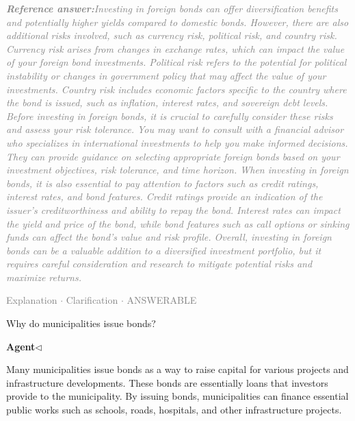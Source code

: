 \documentclass[a4paper,11pt]{article}
\begin{document}
\begin{refanswerenv}
{\footnotesize\textit{\textcolor{gray}{\textbf{Reference answer:}\enspace Investing in foreign bonds can offer diversification benefits and potentially higher yields compared to domestic bonds. However, there are also additional risks involved, such as currency risk, political risk, and country risk. Currency risk arises from changes in exchange rates, which can impact the value of your foreign bond investments. Political risk refers to the potential for political instability or changes in government policy that may affect the value of your investments. Country risk includes economic factors specific to the country where the bond is issued, such as inflation, interest rates, and sovereign debt levels.
Before investing in foreign bonds, it is crucial to carefully consider these risks and assess your risk tolerance. You may want to consult with a financial advisor who specializes in international investments to help you make informed decisions. They can provide guidance on selecting appropriate foreign bonds based on your investment objectives, risk tolerance, and time horizon.
When investing in foreign bonds, it is also essential to pay attention to factors such as credit ratings, interest rates, and bond features. Credit ratings provide an indication of the issuer's creditworthiness and ability to repay the bond. Interest rates can impact the yield and price of the bond, while bond features such as call options or sinking funds can affect the bond's value and risk profile.
Overall, investing in foreign bonds can be a valuable addition to a diversified investment portfolio, but it requires careful consideration and research to mitigate potential risks and maximize returns.}}}
\end{refanswerenv}
\vspace{0.5em}
\hfill{\tiny\textcolor{gray}{Explanation $\cdot$ Clarification $\cdot$ ANSWERABLE}}
\begin{userbubble}
Why do municipalities issue bonds?
\end{userbubble}
\noindent\hfill{\small\textcolor{agentcolor}{\textbf{Agent\enspace$\triangleleft$}}}
\begin{agentbubble}
Many municipalities issue bonds as a way to raise capital for various projects and infrastructure developments. These bonds are essentially loans that investors provide to the municipality. By issuing bonds, municipalities can finance essential public works such as schools, roads, hospitals, and other infrastructure projects.
\end{agentbubble}
\end{document}
